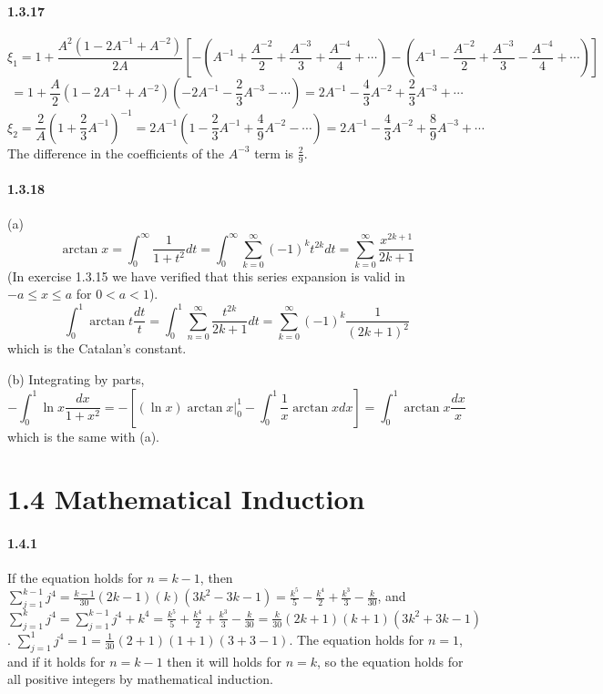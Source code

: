 \documentclass[a4paper]{article}
\begin{document}
\paragraph{1.3.17}
\[\xi_1=1+\frac{A^2(1-2A^{-1}+A^{-2})}{2A}\left[-(A^{-1}+\frac{A^{-2}}{2}+\frac{A^{-3}}{3}+\frac{A^{-4}}{4}+\cdots )-(A^{-1}-\frac{A^{-2}}{2}+\frac{A^{-3}}{3}-\frac{A^{-4}}{4}+\cdots ) \right]\]
\[=1+\frac{A}{2}(1-2A^{-1}+A^{-2})(-2A^{-1}-\frac{2}{3}A^{-3}-\cdots)=2A^{-1}-\frac{4}{3}A^{-2}+\frac{2}{3}A^{-3}+\cdots\]
\[\xi_2=\frac{2}{A}(1+\frac{2}{3}A^{-1})^{-1}=2A^{-1}(1-\frac{2}{3}A^{-1}+\frac{4}{9}A^{-2}-\cdots)=2A^{-1}-\frac{4}{3}A^{-2}+\frac{8}{9}A^{-3}+\cdots\]
The difference in the coefficients of the $A^{-3}$ term is $\frac{2}{9}$.

\paragraph{1.3.18}
(a) \[\arctan{x}=\int_0^\infty\frac{1}{1+t^2}dt=\int_0^\infty\sum_{k=0}^\infty(-1)^k t^{2k}dt=\sum_{k=0}^\infty\frac{x^{2k+1}}{2k+1}\]
(In exercise 1.3.15 we have verified that this series expansion is valid in $-a\leq x\leq a$ for $0<a<1$).
\[\int_{0}^1\arctan{t}\frac{dt}{t}=\int_0^1\sum_{n=0}^\infty\frac{t^{2k}}{2k+1}dt=\sum_{k=0}^\infty(-1)^k\frac{1}{(2k+1)^2}\]
which is the Catalan's constant.

(b) Integrating by parts, 
\[-\int_0^1\ln{x}\frac{dx}{1+x^2}=-\left[(\ln{x})\arctan{x}\Big|_0^1-\int_0^1\frac{1}{x}\arctan{x}dx \right]=\int_0^1\arctan{x}\frac{dx}{x}\]
which is the same with (a).

\section*{1.4 Mathematical Induction}
\paragraph{1.4.1}
If the equation holds for $n=k-1$, then  $\sum_{j=1}^{k-1}j^4=\frac{k-1}{30}(2k-1)(k)(3k^2-3k-1)=\frac{k^5}{5}-\frac{k^4}{2}+\frac{k^3}{3}-\frac{k}{30}$, and $\sum_{j=1}^{k}j^4=\sum_{j=1}^{k-1}j^4+k^4=\frac{k^5}{5}+\frac{k^4}{2}+\frac{k^3}{3}-\frac{k}{30}=\frac{k}{30}(2k+1)(k+1)(3k^2+3k-1)$. $\sum_{j=1}^1j^4=1=\frac{1}{30}(2+1)(1+1)(3+3-1)$. The equation holds for $n=1$, and if it holds for $n=k-1$ then it will holds for $n=k$, so the equation holds for all positive integers by mathematical induction.
\end{document}
